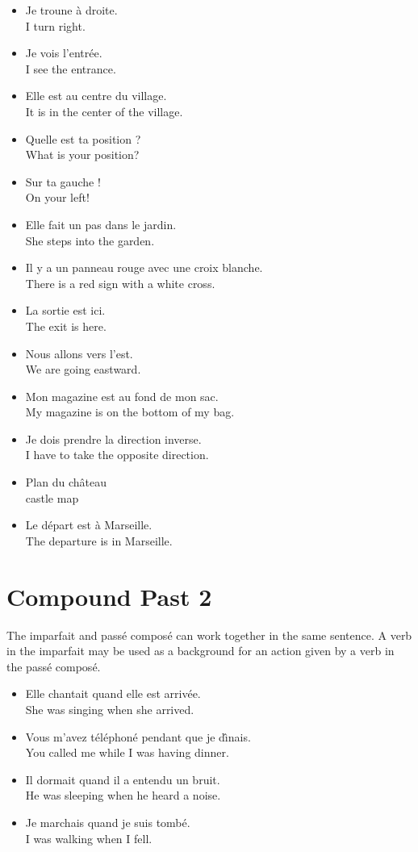 \begin{itemize}
  \item  Je troune {\`a} droite. \\ I turn right.
	\item  Je vois l'entr{\'e}e. \\ I see the entrance.
	\item  Elle est au centre du village. \\ It is in the center of the village.
	\item  Quelle est ta position ? \\ What is your position?
	\item  Sur ta gauche ! \\ On your left!
	\item  Elle fait un pas dans le jardin. \\ She steps into the garden.
	\item  Il y a un panneau rouge avec une croix blanche. \\ There is a red sign with a white cross.
	\item  La sortie est ici. \\ The exit is here.
	\item  Nous allons vers l'est. \\ We are going eastward.
	\item  Mon magazine est au fond de mon sac. \\ My magazine is on the bottom of my bag.
	\item  Je dois prendre la direction inverse. \\ I have to take the opposite direction.
	\item  Plan du ch{\^a}teau \\ castle map
	\item  Le d{\'e}part est {\`a} Marseille. \\ The departure is in Marseille.
\end{itemize}


\pagebreak
\section{Compound Past 2}

The imparfait and pass{\'e} compos{\'e} can work together in the same sentence. A verb in the imparfait may be used as a background for an action given by a verb in the pass{\'e} compos{\'e}.

\begin{itemize}
  \item  Elle chantait quand elle est arriv{\'e}e. \\ She was singing when she arrived.
	\item  Vous m'avez t{\'e}l{\'e}phon{\'e} pendant que je d{\^{\i}}nais. \\ You called me while I was having dinner.
	\item  Il dormait quand il a entendu un bruit. \\ He was sleeping when he heard a noise.
	\item  Je marchais quand je suis tomb{\'e}. \\ I was walking when I fell.
\end{itemize}

